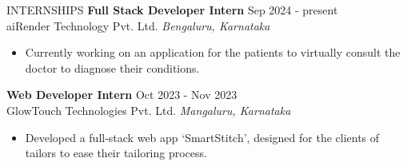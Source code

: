 \documentclass{resume} %
\begin{document}
\begin{rSection}{INTERNSHIPS}
    \textbf{Full Stack Developer Intern} \hfill Sep 2024 - present\\
    aiRender Technology Pvt. Ltd. \hfill \textit{Bengaluru, Karnataka}
    \begin{itemize}
        \itemsep -3pt {}
        \item Currently working on an application for the patients to virtually consult the doctor to diagnose their conditions.
    \end{itemize}

    \textbf{Web Developer Intern} \hfill Oct 2023 - Nov 2023\\
    GlowTouch Technologies Pvt. Ltd. \hfill \textit{Mangaluru, Karnataka}
    \begin{itemize}
        \itemsep -3pt {}
        \item Developed a full-stack web app `SmartStitch', designed for the clients of tailors to ease their tailoring process.
    \end{itemize}


\end{rSection}
\end{document}
